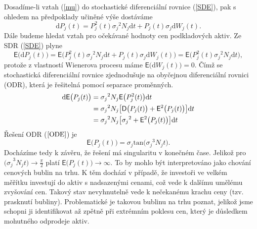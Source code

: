 \documentclass[a4paper,12pt]{report}
\theoremstyle{definition} \newtheorem{definice}[veta]{Definice}
\theoremstyle{remark}
\begin{document}
Dosadíme-li vztah (\ref{mu}) do stochastické diferenciální rovnice (\ref{SDE}), pak s ohledem na předpoklady učiněné výše dostáváme
$$ 
\mathrm{d}P_j(t)=P_j^2(t){\sigma_{j}}^2N_j\mathrm{d}t+P_j(t)\sigma_{j}\mathrm{d}W_j(t).
$$
Dále budeme hledat vztah pro očekávané hodnoty cen podkladových aktiv.
Ze SDR (\ref{SDE}) plyne
\begin{equation}
\mathsf{E}\big(\mathrm{d}P_j(t)\big)=\mathsf{E}\big(P_j^2(t){\sigma_{j}}^2N_j\mathrm{d}t+P_j(t)\sigma_{j}\mathrm{d}W_j(t)\big)=\mathsf{E}\big(P_j^2(t){\sigma_{j}}^2N_j\mathrm{d}t\big),
\end{equation}
protože z vlastností Wienerova procesu máme $\mathsf{E}\big(\mathrm{d}W_j(t)\big)=0$.
Čímž se stochastická diferenciální rovnice zjednodušuje na obyčejnou diferenciální rovnici (ODR), která je řešitelná pomocí separace proměnných.
\begin{align} 
{\mathrm{d}\mathsf{E}\big(P_j(t)\big)}&={\sigma_{j}}^2N_j\mathsf{E}\big(P_j^2(t)\big)\mathrm{d}t \notag\\
&={\sigma_{j}}^2N_j\big[\mathsf{D}\big(P_j(t)\big)+\mathsf{E}^2\big(P_j(t)\big)\big]\mathrm{d}t \notag\\
&={\sigma_{j}}^2N_j\big[{\sigma_{j}}^2+\mathsf{E}^2\big(P_j(t)\big)\big]\mathrm{d}t \label{ODE}
\end{align}  
Řešení ODR ($\ref{ODE}$) je
\begin{equation} 
\mathsf{E}\big(P_j(t)\big)=\sigma_j\mathrm{tan}\big({\sigma_j}^3N_jt\big).
\end{equation}
Docházíme tedy k závěru, že řešení má singularitu v konečném čase.
Jelikož pro ${\big(\sigma_j}^3N_jt\big)\to\frac\pi2$ platí $\mathsf{E}\big(P_j(t)\big)\to\infty$. 
To by mohlo být interpretováno jako chování cenových bublin na trhu.
K těm dochází v případě, že investoři ve velkém měřítku investují do aktiv s nadsazenými cenami, což vede k dalšímu umělému zvyšování cen. 
Takový stav nevyhnutelně vede k nečekanému krachu ceny (tzv. prasknutí bubliny).
Problematické je takovou bublinu na trhu poznat, jelikož jsme schopni ji identifikovat až zpětně při extrémním poklesu cen, který je důsledkem mohutného odprodeje aktiv.
\end{document}
